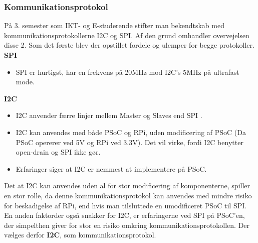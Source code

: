 \documentclass[a4paper,12pt,fleqn,oneside]{article}
\begin{document}
\subsubsection{Kommunikationsprotokol}
På 3. semester som IKT- og E-studerende stifter man bekendtskab med kommunikationsprotokollerne I2C\cite{i2c_protocol} og SPI\cite{spi_protocol}. Af den grund omhandler overvejelsen disse 2. Som det første blev der opstillet fordele og ulemper for begge protokoller.\\
\textbf{SPI}
\begin{itemize}
    \item SPI er hurtigst, har en frekvens på 20MHz mod I2C's 5MHz på ultrafast mode.
\end{itemize}
\textbf{I2C}
\begin{itemize}
    \item I2C anvender færre linjer mellem Master og Slaves end SPI .
    \item I2C kan anvendes med både PSoC og RPi, uden modificering af PSoC (Da PSoC opererer ved 5V og RPi ved 3.3V). Det vil virke, fordi  I2C benytter open-drain og SPI ikke gør.
    \item Erfaringer siger at I2C er nemmest at implementere på PSoC. 
\end{itemize}
Det at I2C kan anvendes uden al for stor modificering af komponenterne, spiller en stor rolle, da denne kommunikationsprotokol kan anvendes med mindre risiko for beskadigelse af RPi, end hvis man tilsluttede en umodificeret PSoC til SPI.\\
En anden faktorder også snakker for I2C, er erfaringerne ved SPI på PSoC'en, der simpelthen giver for stor en risiko omkring kommunikationsprotokollen. Der vælges derfor \textbf{I2C}, som kommunikationsprotokol.


\printbibliography
\end{document}
